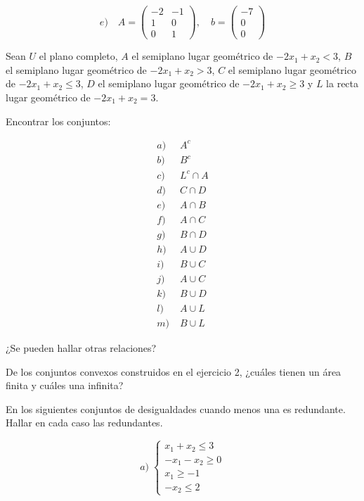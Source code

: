 \begin{Ejer}
\begin{Ejer}
\[
e)\quad
A=
\begin{pmatrix}
-2 & -1\\
1 & 0\\
0 & 1
\end{pmatrix},
\quad
b=
\begin{pmatrix}
-7\\
0\\
0
\end{pmatrix}
\]
\end{Ejer}

\begin{Ejer} Sean $U$ el plano completo, $A$ el semiplano lugar geom\'etrico de $-2x_1 + x_2 < 3$,  
$B$ el semiplano lugar geom\'etrico de $-2x_1 + x_2 > 3$,  
$C$ el semiplano lugar geom\'etrico de $-2x_1 + x_2 \le 3$,  
$D$ el semiplano lugar geom\'etrico de $-2x_1 + x_2 \ge 3$  
y $L$ la recta lugar geom\'etrico de $-2x_1 + x_2 = 3$.

Encontrar los conjuntos:

\[
\begin{aligned}
a)&\; A^c \\
b)&\; B^c \\
c)&\; L^c \cap A \\
d)&\; C \cap D \\
e)&\; A \cap B \\
f)&\; A \cap C \\
g)&\; B \cap D \\
h)&\; A \cup D \\
i)&\; B \cup C \\
j)&\; A \cup C \\
k)&\; B \cup D \\
l)&\; A \cup L \\
m)&\; B \cup L
\end{aligned}
\]

¿Se pueden hallar otras relaciones?

\end{Ejer}

\begin{Ejer}  De los conjuntos convexos construidos en el ejercicio 2, ¿cu\'ales tienen un \'area finita y cu\'ales una infinita?

\end{Ejer}


\begin{Ejer}  En los siguientes conjuntos de desigualdades cuando menos una es redundante. Hallar en cada caso las redundantes.

\[
a)\;
\begin{cases}
x_1 + x_2 \le 3 \\
-x_1 - x_2 \ge 0 \\
x_1 \ge -1 \\
-x_2 \le 2
\end{cases}
\]


\end{Ejer}
\end{Ejer}
